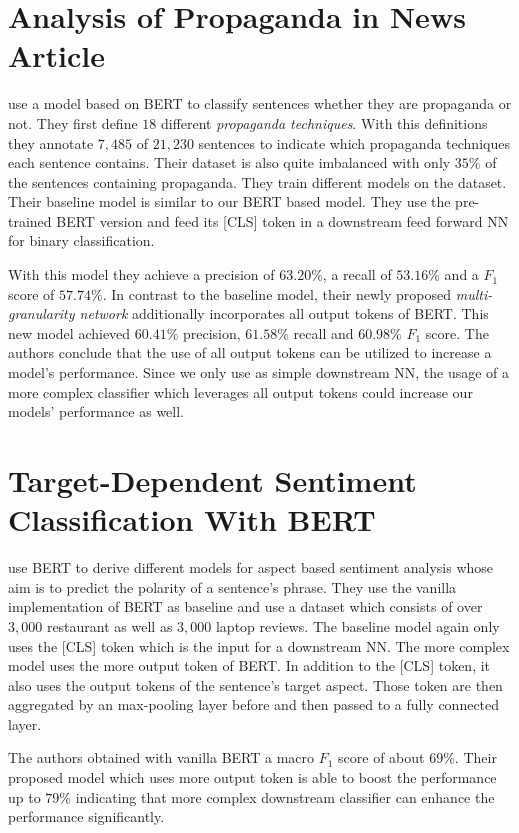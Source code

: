 \section{Analysis of Propaganda in News Article}
\Textcite{Martino:2019} use a model based on \ac{BERT} to classify sentences whether they are propaganda or not.
They first define $18$ different \textit{propaganda techniques}.
With this definitions they annotate $7,485$ of $21,230$ sentences to indicate which propaganda techniques each sentence contains.
Their dataset is also quite imbalanced with only $35\%$ of the sentences containing propaganda.
They train different models on the dataset.
Their baseline model is similar to our \ac{BERT} based model.
They use the pre-trained \ac{BERT} version and feed its [CLS] token in a downstream feed forward \ac{NN} for binary classification.

With this model they achieve a precision of $63.20\%$, a recall of $53.16\%$ and a $F_1$ score of $57.74\%$.
In contrast to the baseline model, their newly proposed \textit{multi-granularity network} additionally incorporates all output tokens of \ac{BERT}.
This new model achieved $60.41\%$ precision, $61.58\%$ recall and $60.98\%$ $F_1$ score.
The authors conclude that the use of all output tokens can be utilized to increase a model's performance.
Since we only use as simple downstream \ac{NN}, the usage of a more complex classifier which leverages all output tokens could increase our models' performance as well.

\section[Target-Dependent Sentiment Classification With BERT]{Target-Dependent Sentiment Classification With \ac{BERT}}
\Textcite{Gao:2019} use \ac{BERT} to derive different models for aspect based sentiment analysis whose aim is to predict the polarity of a sentence's phrase.
They use the vanilla implementation of \ac{BERT} as baseline and use a dataset which consists of over $3,000$ restaurant as well as $3,000$ laptop reviews.
The baseline model again only uses the [CLS] token which is the input for a downstream \ac{NN}.
The more complex model uses the more output token of \ac{BERT}.
In addition to the [CLS] token, it also uses the output tokens of the sentence's target aspect.
Those token are then aggregated by an max-pooling layer before and then passed to a fully connected layer.

The authors obtained with vanilla \ac{BERT} a macro $F_1$ score of about $69\%$.
Their proposed model which uses more output token is able to boost the performance up to $79\%$ indicating that more complex downstream classifier can enhance the performance significantly.

